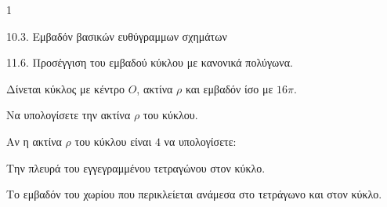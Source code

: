 \begin{ylh}{1}
    \item 10.3. Εμβαδόν βασικών ευθύγραμμων σχημάτων
    \item 11.6. Προσέγγιση του εμβαδού κύκλου με κανονικά πολύγωνα.
\end{ylh}
\begin{figure} %
    \centering
\end{figure}

Δίνεται κύκλος με κέντρο $O$, ακτίνα $\rho$ και εμβαδόν ίσο με $16\pi$.
\begin{alist}
    \item Να υπολογίσετε την ακτίνα $\rho$ του κύκλου. 
    \item Αν η ακτίνα $\rho$ του κύκλου είναι $4$ να υπολογίσετε:
    \begin{rlist}
        \item Την πλευρά του εγγεγραμμένου τετραγώνου στον κύκλο. 
        \item Το εμβαδόν του χωρίου που περικλείεται ανάμεσα στο τετράγωνο και στον κύκλο. 
    \end{rlist}
\end{alist}